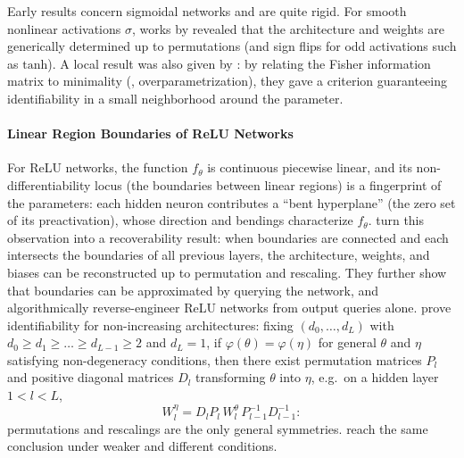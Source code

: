 \documentclass[mathematics,review,submit,moreauthors]{Definitions/mdpi}
\begin{document}
Early results concern sigmoidal networks and are quite rigid.
For smooth nonlinear activations $\sigma$, works by \citet{albertini1993,fefferman1993anips} revealed that the architecture and weights are generically determined up to permutations (and sign flips for odd activations such as $\mathrm{tanh}$).
A local result was also given by \citet{fukumizu1996nn}: by relating the Fisher information matrix to minimality (, overparametrization), they gave a criterion guaranteeing identifiability in a small neighborhood around the parameter.

\paragraph{Linear Region Boundaries of ReLU Networks}
For ReLU networks, the function $f_\theta$ is continuous piecewise linear, and its non-differentiability locus (the boundaries between linear regions) is a fingerprint of the parameters: each hidden neuron contributes a ``bent hyperplane'' (the zero set of its preactivation), whose direction and bendings characterize $f_\theta$.
\citet{rolnick2020p3icml} turn this observation into a recoverability result: when boundaries are connected and each intersects the boundaries of all previous layers, the architecture, weights, and biases can be reconstructed up to permutation and rescaling.
They further show that boundaries can be approximated by querying the network, and algorithmically reverse-engineer ReLU networks from output queries alone.
\citet{phuong2019} prove identifiability for non-increasing architectures: fixing $(d_0,\dots,d_L)$ with $d_0\ge d_1\ge\dots\ge d_{L-1}\ge 2$ and $d_L=1$, if $\varphi(\theta)=\varphi(\eta)$ for general $\theta$ and $\eta$ satisfying non-degeneracy conditions, then there exist permutation matrices $P_l$ and positive diagonal matrices $D_l$ transforming $\theta$ into $\eta$, e.g.\ on a hidden layer $1<l<L$,
\begin{equation*}
    W_l^{\eta}=D_lP_l\,W_l^{\theta}\,P_{l-1}^{-1}D_{l-1}^{-1}:
\end{equation*}
permutations and rescalings are the only general symmetries.
\citet{bona-pellissier2023} reach the same conclusion under weaker and different conditions.
\end{document}
